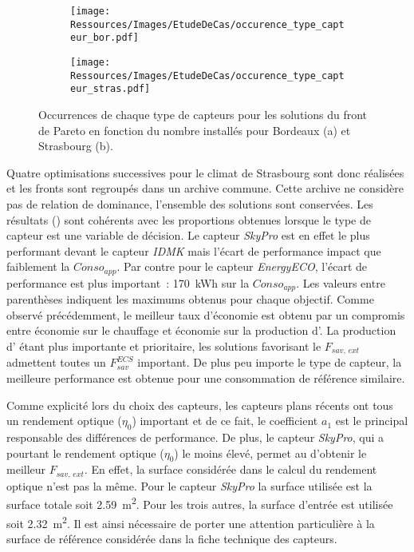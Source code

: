 \begin{figure}
    \centering
    \begin{subfigure}[b]{0.45\textwidth}
        \centering
        \texttt{[image: Ressources/Images/EtudeDeCas/occurence\_type\_capteur\_bor.pdf]}
        \caption{}
        \label{fig:occurence_type_capteur_bor}
    \end{subfigure}
    \quad
    \begin{subfigure}[b]{0.45\textwidth}
        \centering
        \texttt{[image: Ressources/Images/EtudeDeCas/occurence\_type\_capteur\_stras.pdf]}
        \caption{}
        \label{fig:occurence_type_capteur_stras}
    \end{subfigure}
    \caption[Occurrences de chaque type de capteurs pour les solutions du front de Pareto]
             {Occurrences de chaque type de capteurs pour les solutions du front de Pareto
              en fonction du nombre installés pour Bordeaux (a) et Strasbourg (b).}
    \label{fig:occurence_type_capteur}
\end{figure}

Quatre optimisations successives pour le climat de Strasbourg sont donc réalisées
et les fronts sont regroupés dans un archive commune.
Cette archive ne considère pas de relation de dominance, l’ensemble des solutions sont
conservées. Les résultats () sont cohérents avec les
proportions obtenues lorsque le type de capteur est une variable de décision. Le capteur
\textit{SkyPro} est en effet le plus performant devant le capteur \textit{IDMK} mais
l’écart de performance impact que faiblement la $Conso_{app}$. Par contre pour le capteur \textit{EnergyECO},
l’écart de performance est plus important~: \SI{170}{kWh} sur la $Conso_{app}$.
Les valeurs entre parenthèses indiquent les maximums obtenus pour chaque objectif.
Comme observé précédemment, le meilleur taux d’économie est obtenu par un compromis
entre économie sur le chauffage et économie sur la production d’. La production d’ étant
plus importante et prioritaire, les solutions favorisant le $F_{sav,\, ext}$ admettent toutes
un $F_{sav}^{ECS}$ important. De plus peu importe le type de capteur, la
meilleure performance est obtenue pour une consommation de référence similaire.

Comme explicité lors du choix des capteurs, les capteurs plans récents ont tous un
rendement optique ($\eta_{0}$) important et de ce fait, le coefficient $a_{1}$ est le
principal responsable des différences de performance. De plus, le capteur \textit{SkyPro},
qui a pourtant le rendement optique ($\eta_{0}$) le moins élevé, permet au 
d’obtenir le meilleur $F_{sav,\, ext}$. En effet, la surface considérée dans le calcul du
rendement optique n’est pas la même. Pour le capteur \textit{SkyPro} la surface utilisée
est la surface totale soit \SI{2.59}{\metre\squared}. Pour les trois autres, la surface
d’entrée est utilisée soit \SI{2.32}{\metre\squared}. Il est ainsi nécessaire de porter
une attention particulière à la surface de référence considérée dans la fiche technique
des capteurs.

